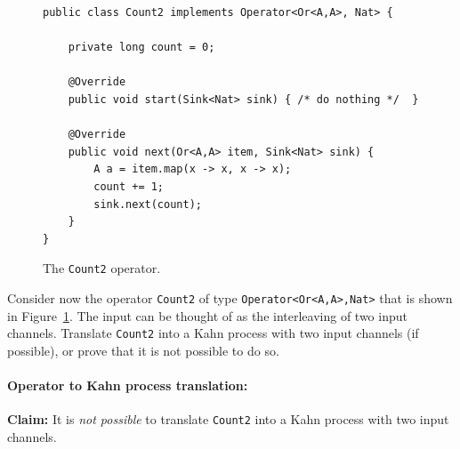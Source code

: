 \documentclass[11pt]{article}
\newcommand{\mnt}[1]{{\small\texttt{#1}}}
\theoremstyle{definition}
\begin{document}
\begin{figure}[t!]
	\footnotesize
	\begin{verbatim}
public class Count2 implements Operator<Or<A,A>, Nat> {

	private long count = 0;

	@Override
	public void start(Sink<Nat> sink) { /* do nothing */  }

	@Override
	public void next(Or<A,A> item, Sink<Nat> sink) {
		A a = item.map(x -> x, x -> x);
		count += 1;
		sink.next(count);
	}
}
\end{verbatim}
	\caption{The \mnt{Count2} operator.}
	\label{fig:count2}
\end{figure}

Consider now the operator \mnt{Count2} of type \mnt{Operator<Or<A,A>,Nat>} that is shown in Figure~\ref{fig:count2}. The input can be thought of as the interleaving of two input channels. Translate \mnt{Count2} into a Kahn process with two input channels (if possible), or prove that it is not possible to do so.

\paragraph{Operator to Kahn process translation:}

\textbf{Claim:} It is \emph{not possible} to translate \mnt{Count2} into a Kahn process with two input channels.
\end{document}
